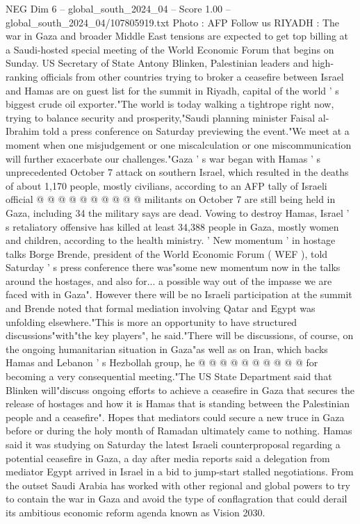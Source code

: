 \begin{textsample}{NEG Dim 6 – global\_south\_2024\_04 – Score 1.00 – global\_south\_2024\_04/107805919.txt}
Photo : AFP Follow us RIYADH : The war in Gaza and broader Middle East tensions are expected to get top billing at a Saudi-hosted special meeting of the World Economic Forum that begins on Sunday.
US Secretary of State Antony Blinken, Palestinian leaders and high-ranking officials from other countries trying to broker a ceasefire between Israel and Hamas are on guest list for the summit in Riyadh, capital of the world ' s biggest crude oil exporter."The world is today walking a tightrope right now, trying to balance security and prosperity,"Saudi planning minister Faisal al-Ibrahim told a press conference on Saturday previewing the event."We meet at a moment when one misjudgement or one miscalculation or one miscommunication will further exacerbate our challenges."Gaza ' s war began with Hamas ' s unprecedented October 7 attack on southern Israel, which resulted in the deaths of about 1,170 people, mostly civilians, according to an AFP tally of Israeli official @ @ @ @ @ @ @ @ @ @ militants on October 7 are still being held in Gaza, including 34 the military says are dead.
Vowing to destroy Hamas, Israel ' s retaliatory offensive has killed at least 34,388 people in Gaza, mostly women and children, according to the health ministry. ' New momentum ' in hostage talks Borge Brende, president of the World Economic Forum ( WEF ), told Saturday ' s press conference there was"some new momentum now in the talks around the hostages, and also for... a possible way out of the impasse we are faced with in Gaza".
However there will be no Israeli participation at the summit and Brende noted that formal mediation involving Qatar and Egypt was unfolding elsewhere."This is more an opportunity to have structured discussions"with"the key players", he said."There will be discussions, of course, on the ongoing humanitarian situation in Gaza"as well as on Iran, which backs Hamas and Lebanon ' s Hezbollah group, he @ @ @ @ @ @ @ @ @ @ for becoming a very consequential meeting."The US State Department said that Blinken will"discuss ongoing efforts to achieve a ceasefire in Gaza that secures the release of hostages and how it is Hamas that is standing between the Palestinian people and a ceasefire".
Hopes that mediators could secure a new truce in Gaza before or during the holy month of Ramadan ultimately came to nothing.
Hamas said it was studying on Saturday the latest Israeli counterproposal regarding a potential ceasefire in Gaza, a day after media reports said a delegation from mediator Egypt arrived in Israel in a bid to jump-start stalled negotiations.
From the outset Saudi Arabia has worked with other regional and global powers to try to contain the war in Gaza and avoid the type of conflagration that could derail its ambitious economic reform agenda known as Vision 2030.

\end{textsample}
